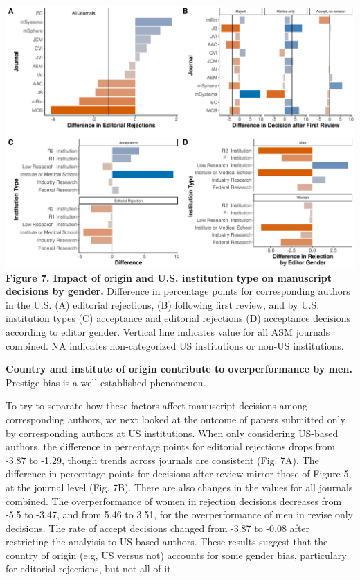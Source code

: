 \documentclass[11pt,]{article}
\begin{document}
\includegraphics{Figure_7.png} \textbf{Figure 7. Impact of origin and
U.S. institution type on manuscript decisions by gender.} Difference in
percentage points for corresponding authors in the U.S. (A) editorial
rejections, (B) following first review, and by U.S. institution types
(C) acceptance and editorial rejections (D) acceptance decisions
according to editor gender. Vertical line indicates value for all ASM
journals combined. NA indicates non-categorized US institutions or
non-US institutions.

\textbf{Country and institute of origin contribute to overperformance by
men.} Prestige bias is a well-established phenomenon.

To try to separate how these factors affect manuscript decisions among
corresponding authors, we next looked at the outcome of papers submitted
only by corresponding authors at US institutions. When only considering
US-based authors, the difference in percentage points for editorial
rejections drops from -3.87 to -1.29, though trends across journals are
consistent (Fig. 7A). The difference in percentage points for decisions
after review mirror those of Figure 5, at the journal level (Fig. 7B).
There are also changes in the values for all journals combined. The
overperformance of women in rejection decisions decreases from -5.5 to
-3.47, and from 5.46 to 3.51, for the overperformance of men in revise
only decisions. The rate of accept decisions changed from -3.87 to -0.08
after restricting the analyisis to US-based authors. These results
suggest that the country of origin (e.g, US versus not) accounts for
some gender bias, particulary for editorial rejections, but not all of
it.
\end{document}
